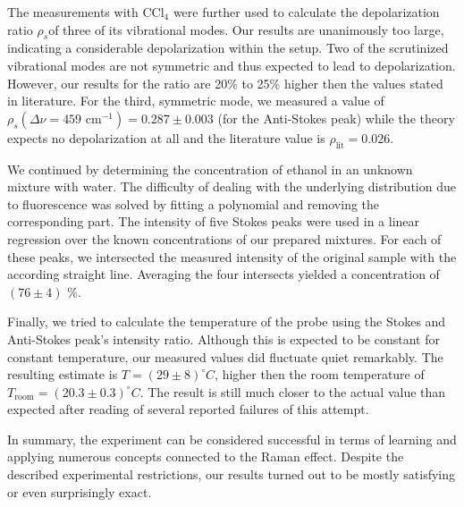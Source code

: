 The measurements with CCl$_4$ were further used to calculate the depolarization ratio $\rho_s $of three of its vibrational
modes. Our results are unanimously too large, indicating a considerable depolarization within the setup. Two of the 
scrutinized vibrational modes are not symmetric and thus expected to lead to depolarization. However, our results for the 
ratio are 20\% to 25\% higher then the values stated in literature. For the third, symmetric mode, we measured a value
of $\rho_s(\Delta \nu = 459 \text{ cm}^{-1}) = 0.287 \pm 0.003$ (for the Anti-Stokes peak) while the theory expects no
depolarization at all and the literature value is $\rho_\text{lit} = 0.026$. 

We continued by determining the concentration of ethanol in an unknown mixture with water. The difficulty of dealing with 
the underlying distribution due to fluorescence was solved by fitting a polynomial and removing the corresponding part. 
The intensity of five Stokes peaks were used in a linear regression over the known concentrations of our prepared 
mixtures. For each of these peaks, we intersected the measured intensity of the original sample with the according 
straight line. Averaging the four intersects yielded a concentration of $(76 \pm 4)$ \%.

Finally, we tried to calculate the temperature of the probe using the Stokes and Anti-Stokes peak's intensity ratio. 
Although this is expected to be constant for constant temperature, our measured values did fluctuate quiet remarkably. The 
resulting estimate is $T = (29 \pm 8) ^\circ C$, higher then the room temperature of 
$T_\text{room} = (20.3 \pm 0.3) ^\circ C$. The result is still much closer to the actual value than expected after reading
of several reported failures of this attempt.

In summary, the experiment can be considered successful in terms of learning and applying numerous concepts connected to 
the Raman effect. Despite the described experimental restrictions, our results turned out to be mostly satisfying or even
surprisingly exact. 
